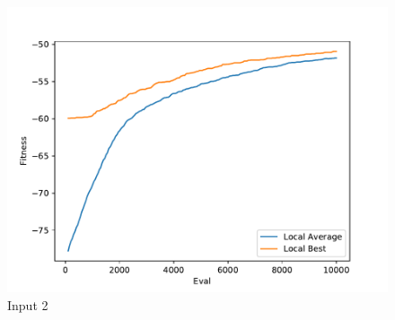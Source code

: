 \documentclass{standalone}
\begin{document}
\begin{figure}[!htb]
	\caption{Input 2}
	\label{fig:graph_2014}
	\includegraphics[width=\textwidth]{../graphs/graphs/2014.pdf}
\end{figure}
\end{document}
